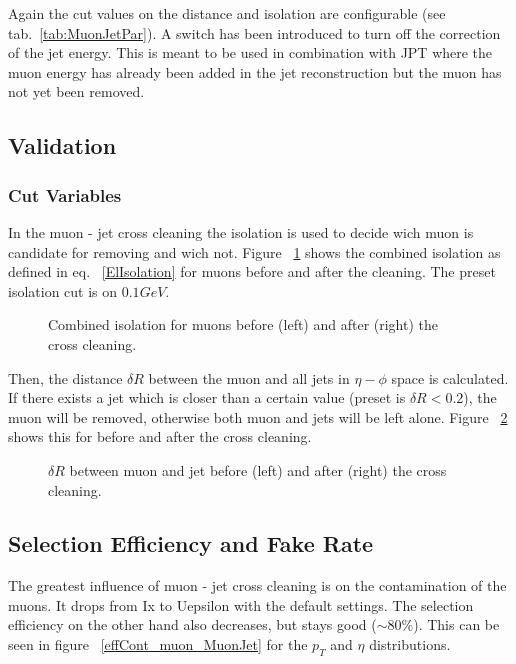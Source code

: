 \documentclass{cmspaper}
\begin{document}
Again the cut values on the distance and isolation are configurable (see
tab.~\ref{tab:MuonJetPar}). A switch has been introduced to turn off
the correction of the jet energy. This is meant to be used in combination with
JPT where the muon energy has already been added in the jet reconstruction but
the muon has not yet been removed.

\subsection{Validation}
\subsubsection{Cut Variables}
In the muon - jet cross cleaning the isolation is used to decide wich muon is candidate for removing and wich not. Figure ~\ref{fig:MuonIsolation} shows the combined isolation as defined in eq. ~\ref{ElIsolation} for muons before and after the cleaning. The preset isolation cut is on \(0.1 GeV\). 

\begin{figure}[hb]
\begin{center}
    \caption{Combined isolation for muons before (left) and after (right) the cross cleaning. {\color{red}{Platzhalter!}}}
\label{fig:MuonIsolation}
\end{center}
\end{figure}

Then, the distance \(\delta R\) between the muon and all jets in \(\eta - \phi\) space is calculated. If there exists a jet which is closer than a certain value (preset is \(\delta R < 0.2\)), the muon will be removed, otherwise both muon and jets will be left alone. Figure ~\ref{fig:dR_MuonJet_noniso} shows this for before and after the cross cleaning.

\begin{figure}[hb]
\begin{center}
    \caption{\(\delta R\) between muon and jet before (left) and after (right) the cross cleaning. {\color{red}{Platzhalter!}}}
\label{fig:dR_MuonJet_noniso}
\end{center}
\end{figure}


\subsection{Selection Efficiency and Fake Rate}
The greatest influence of muon - jet cross cleaning is on the contamination of the muons. It drops from {\color{red}Ix} to {\color{red}Uepsilon} with the default settings. The selection efficiency on the other hand also decreases, but stays good {\color{red}(\(\sim 80\%\))}. This can be seen in figure ~\ref{effCont_muon_MuonJet} for the \(p_T\) and \(\eta\) distributions. 
\end{document}
